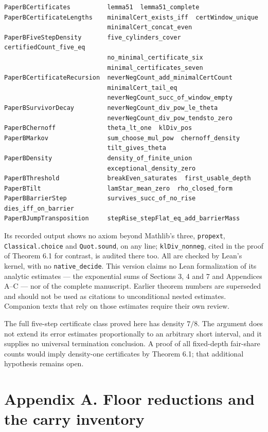 \documentclass[11pt,a4paper]{article}
\begin{document}
\begin{verbatim}
PaperBCertificates          lemma51  lemma51_complete
PaperBCertificateLengths    minimalCert_exists_iff  certWindow_unique
                            minimalCert_concat_even
PaperBFiveStepDensity       five_cylinders_cover  certifiedCount_five_eq
                            no_minimal_certificate_six
                            minimal_certificates_seven
PaperBCertificateRecursion  neverNegCount_add_minimalCertCount
                            minimalCert_tail_eq
                            neverNegCount_succ_of_window_empty
PaperBSurvivorDecay         neverNegCount_div_pow_le_theta
                            neverNegCount_div_pow_tendsto_zero
PaperBChernoff              theta_lt_one  klDiv_pos
PaperBMarkov                sum_choose_mul_pow  chernoff_density
                            tilt_gives_theta
PaperBDensity               density_of_finite_union
                            exceptional_density_zero
PaperBThreshold             breakEven_saturates  first_usable_depth
PaperBTilt                  lamStar_mean_zero  rho_closed_form
PaperBBarrierStep           survives_succ_of_no_rise  dies_iff_on_barrier
PaperBJumpTransposition     stepRise_stepFlat_eq_add_barrierMass
\end{verbatim}

Its recorded output shows no axiom beyond Mathlib's three,
\texttt{propext}, \texttt{Classical.choice} and \texttt{Quot.sound}, on
any line; \texttt{klDiv\_nonneg}, cited in the proof of Theorem 6.1 for
contrast, is audited there too. All are checked by Lean's kernel, with
no \texttt{native\_decide}. This version claims no Lean formalization of
its analytic estimates --- the exponential sums of Sections 3, 4 and 7
and Appendices A--C --- nor of the complete manuscript. Earlier theorem
numbers are superseded and should not be used as citations to
unconditional nested estimates. Companion texts that rely on those
estimates require their own review.

The full five-step certificate class proved here has density \(7/8\).
The argument does not extend its error estimates proportionally to an
arbitrary short interval, and it supplies no universal termination
conclusion. A proof of all fixed-depth fair-share counts would imply
density-one certificates by Theorem 6.1; that additional hypothesis
remains open.

\section{Appendix A. Floor reductions and the carry
inventory}\label{appendix-a.-floor-reductions-and-the-carry-inventory}
\end{document}
